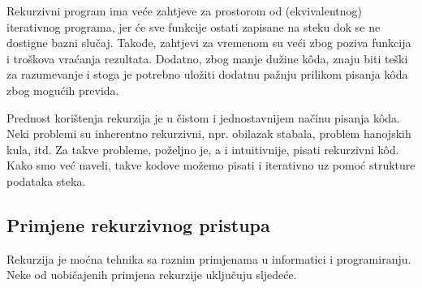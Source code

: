 
Rekurzivni program ima veće zahtjeve za prostorom od (ekvivale\-ntnog) iterativnog programa, jer će sve funkcije ostati zapisane na steku dok se ne dostigne bazni slučaj. Takođe,  zahtjevi za vremenom su veći zbog poziva funkcija i   troškova vraćanja rezultata. Dodatno, zbog manje dužine k\^oda,  znaju biti teški za razumevanje i stoga je potrebno uložiti  dodatnu pažnju prilikom pisanja k\^oda zbog mogućih previda. %

Prednost korištenja rekurzija je u čistom i jednostavnijem načinu pisanja k\^oda. Neki problemi su inherentno rekurzivni, npr. obilazak stabala, problem hanojskih kula, itd. Za takve probleme, poželjno je, a i intuitivnije,  pisati rekurzivni k\^od. Kako smo već naveli, takve kodove možemo pisati i iterativno uz pomoć strukture podataka steka.

\subsection{Primjene rekurzivnog pristupa}

Rekurzija je moćna tehnika sa raznim primjenama u informatici i programira\-nju. Neke od uobičajenih primjena rekurzije uključuju sljedeće.

